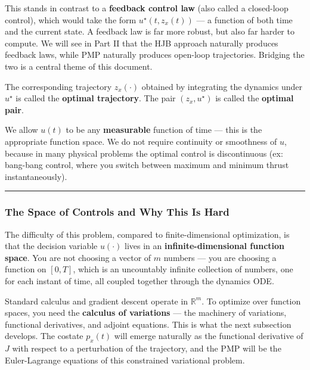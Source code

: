 \documentclass{article}
\begin{document}
This stands in contrast to a \textbf{feedback control law} (also called a closed-loop control), which would take the form $u^\star(t, z_x(t))$ — a function of both time and the current state. A feedback law is far more robust, but also far harder to compute. We will see in Part II that the HJB approach naturally produces feedback laws, while PMP naturally produces open-loop trajectories. Bridging the two is a central theme of this document.

The corresponding trajectory $z_x(\cdot)$ obtained by integrating the dynamics under $u^\star$ is called the \textbf{optimal trajectory}. The pair $(z_x, u^\star)$ is called the \textbf{optimal pair}.

\begin{mathrequirementsbox}
We allow $u(t)$ to be any \textbf{measurable} function of time — this is the appropriate function space. We do not require continuity or smoothness of $u$, because in many physical problems the optimal control is discontinuous (ex: bang-bang control, where you switch between maximum and minimum thrust instantaneously).
\end{mathrequirementsbox}

\medskip\hrule\medskip

\begin{mathrequirementsbox}
\subsubsection{The Space of Controls and Why This Is Hard}

The difficulty of this problem, compared to finite-dimensional optimization, is that the decision variable $u(\cdot)$ lives in an \textbf{infinite-dimensional function space}. You are not choosing a vector of $m$ numbers — you are choosing a function on $[0,T]$, which is an uncountably infinite collection of numbers, one for each instant of time, all coupled together through the dynamics ODE.

Standard calculus and gradient descent operate in $\mathbb{R}^m$. To optimize over function spaces, you need the \textbf{calculus of variations} — the machinery of variations, functional derivatives, and adjoint equations. This is what the next subsection develops. The costate $p_x(t)$ will emerge naturally as the functional derivative of $J$ with respect to a perturbation of the trajectory, and the PMP will be the Euler-Lagrange equations of this constrained variational problem.
\end{mathrequirementsbox}
\end{document}
